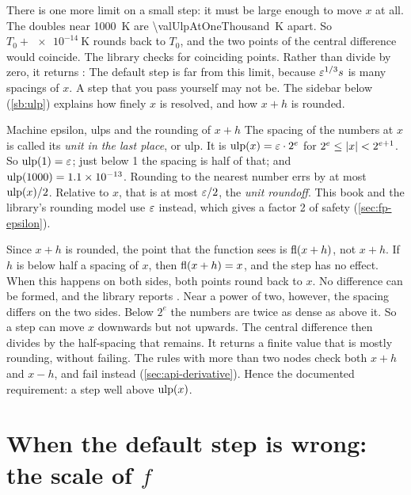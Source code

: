 There is one more limit on a small step: it must be large enough to move $x$ at all. The doubles near
\SI{1000}{\kelvin} are \SI{\valUlpAtOneThousand}{\kelvin} apart. So $T_0 + \SI{e-14}{\kelvin}$ rounds back to $T_0$,
and the two points of the central difference would coincide. The library checks for coinciding points. Rather than
divide by zero, it returns :
The default step is far from this limit, because $\varepsilon^{1/3} s$ is many spacings of $x$. A step that you
pass yourself may not be. The sidebar below (\cref{sb:ulp}) explains how finely $x$ is resolved, and how $x + h$ is
rounded.

\begin{sidebar}[label=sb:ulp]{Machine epsilon, ulps and the rounding of $x + h$}
The spacing of the numbers at $x$ is called its \emph{unit in the last place}, or ulp. It is
$\operatorname{ulp}(x) = \varepsilon \cdot 2^{e}$ for $2^{e} \le \lvert x \rvert < 2^{e+1}$. So $\operatorname{ulp}(1) = \varepsilon$; just below 1 the spacing
is half of that; and $\operatorname{ulp}(1000) = \num{1.1e-13}$. Rounding to the nearest number errs by at most
$\operatorname{ulp}(x) / 2$. Relative to $x$, that is at most $\varepsilon / 2$, the \emph{unit roundoff}. This book and the library's
rounding model use $\varepsilon$ instead, which gives a factor 2 of safety (\cref{sec:fp-epsilon}).

Since $x + h$ is rounded, the point that the function sees is $\operatorname{fl}(x + h)$, not $x + h$. If $h$ is below half a
spacing of $x$, then $\operatorname{fl}(x + h) = x$, and the step has no effect. When this happens on both sides, both points round
back to $x$. No difference can be formed, and the library reports . Near a power of two,
however, the spacing differs on the two sides. Below $2^e$ the numbers are twice as dense as above it. So a step can
move $x$ downwards but not upwards. The central difference then divides by the half-spacing that remains. It returns
a finite value that is mostly rounding, without failing. The rules with more than two nodes check both $x + h$ and
$x - h$, and fail instead (\cref{sec:api-derivative}). Hence the documented requirement: a step well above
$\operatorname{ulp}(x)$.
\end{sidebar}

\section{When the default step is wrong: the scale of $f$}\label{sec:rounding-scale}

